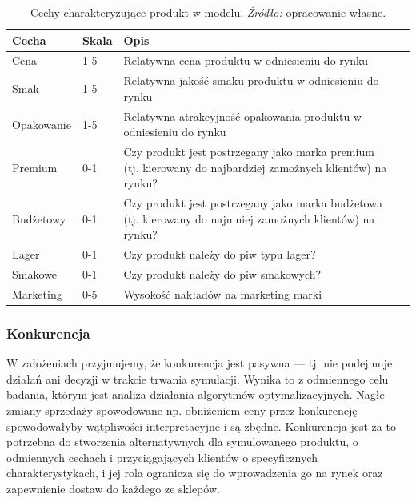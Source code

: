 \documentclass[polish, twoside, 12pt, a4paper]{article}
\theoremstyle{definition}
\theoremstyle{plain}
\theoremstyle{remark}
\begin{document}
\begin{table}[hbt]
  \centering
  \captionsetup{margin=10pt,font=small,labelfont=bf,width=.8\textwidth}
  \caption[Cechy charakteryzujące produkt w modelu]{Cechy charakteryzujące produkt w modelu. \textit{Źródło:} opracowanie własne.}
  \label{tab:cechyproduktu}
\vspace*{2ex}
\begin{tabular}{llll}
\hline
Cecha       & Skala & Opis                                                                                                        \\ \hline
Cena        & 1-5   & Relatywna cena produktu w odniesieniu do rynku                                                              \\
Smak        & 1-5   & Relatywna jakość smaku produktu w odniesieniu do rynku                                                      \\
Opakowanie  & 1-5   & Relatywna atrakcyjność opakowania produktu w odniesieniu do rynku                                           \\
Premium      & 0-1   & Czy produkt jest postrzegany jako marka premium (tj. kierowany do najbardziej zamożnych klientów) na rynku? \\
Budżetowy   & 0-1   & Czy produkt jest postrzegany jako marka budżetowa (tj. kierowany do najmniej zamożnych klientów) na rynku?  \\
Lager        & 0-1   & Czy produkt należy do piw typu lager?                                                                       \\
Smakowe     & 0-1   & Czy produkt należy do piw smakowych?                                                                        \\
Marketing   & 0-5   & Wysokość nakładów na marketing marki                                                                        \\ \hline
\end{tabular}
\end{table}

\subsubsection{Konkurencja}
 
W założeniach przyjmujemy, że konkurencja jest pasywna --- tj. nie podejmuje działań ani decyzji w trakcie trwania symulacji. Wynika to z odmiennego celu badania, którym jest analiza działania algorytmów optymalizacyjnych. Nagłe zmiany sprzedaży spowodowane np. obniżeniem ceny przez konkurencję spowodowałyby wątpliwości interpretacyjne i są zbędne. Konkurencja jest za to potrzebna do stworzenia alternatywnych dla symulowanego produktu, o odmiennych cechach i przyciągających klientów o specyficznych charakterystykach, i jej rola ogranicza się do wprowadzenia go na rynek oraz zapewnienie dostaw do każdego ze sklepów.
\end{document}
